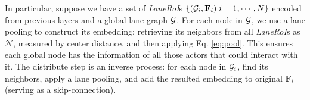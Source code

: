 In particular, suppose we have a set of \textit{LaneRoI}s $\{(\mathcal{G}_i,
\mathbf{F}_i)|i=1,\cdots,N\}$ encoded from previous layers and a global lane
graph $\mathcal{G}$. For each node in $\mathcal{G}$, we use a lane pooling to construct its
embedding: retrieving its neighbors from all \textit{LaneRoI}s as $\mathcal{N}$,
measured by center distance, and then applying Eq. \ref{eq:pool}. This ensures
each global node has the information of all those actors that could 
interact with it. The distribute step is an inverse process: for each node in
$\mathcal{G}_i$, find its neighbors, apply a lane pooling, and add the resulted embedding to original $\mathbf{F}_i$ (serving as a
skip-connection).






